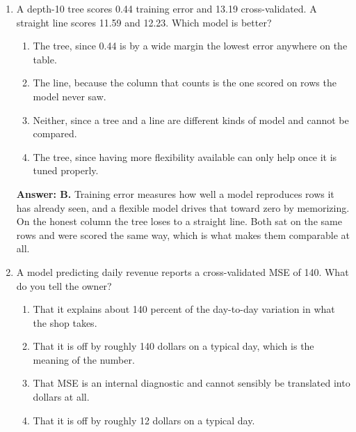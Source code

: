 \documentclass[11pt]{article}
\begin{document}
\begin{enumerate}[itemsep=14pt]
\vspace{2pt}
\textbf{Answer: C.} Flexibility is bought with sample size. At 300 rows and 80 columns a flexible model fits beautifully and predicts badly, because most of what it is fitting is noise. Regularized regression is the sensible move, used to cut 80 columns down to a few you can defend.
\vspace{4pt}

\item A depth-10 tree scores 0.44 training error and 13.19 cross-validated. A straight line scores 11.59 and 12.23. Which model is better?

\begin{enumerate}[label=\Alph*., itemsep=1pt, topsep=3pt]
  \item The tree, since 0.44 is by a wide margin the lowest error anywhere on the table.
  \item The line, because the column that counts is the one scored on rows the model never saw.
  \item Neither, since a tree and a line are different kinds of model and cannot be compared.
  \item The tree, since having more flexibility available can only help once it is tuned properly.
\end{enumerate}

\vspace{2pt}
\textbf{Answer: B.} Training error measures how well a model reproduces rows it has already seen, and a flexible model drives that toward zero by memorizing. On the honest column the tree loses to a straight line. Both sat on the same rows and were scored the same way, which is what makes them comparable at all.
\vspace{4pt}

\item A model predicting daily revenue reports a cross-validated MSE of 140. What do you tell the owner?

\begin{enumerate}[label=\Alph*., itemsep=1pt, topsep=3pt]
  \item That it explains about 140 percent of the day-to-day variation in what the shop takes.
  \item That it is off by roughly 140 dollars on a typical day, which is the meaning of the number.
  \item That MSE is an internal diagnostic and cannot sensibly be translated into dollars at all.
  \item That it is off by roughly 12 dollars on a typical day.
\end{enumerate}


\end{enumerate}
\end{document}
